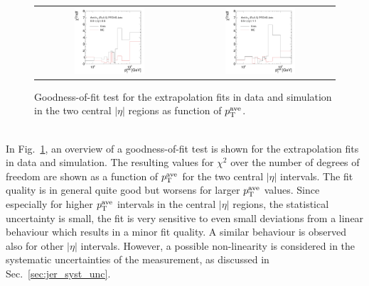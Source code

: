 \begin{figure}[!tp]
  \centering
  \begin{tabular}{cc}
                \includegraphics[width=0.49\textwidth]{figures/GoodnessOfFit_Eta0_final_nominal_v4.pdf} &
                \includegraphics[width=0.49\textwidth]{figures/GoodnessOfFit_Eta1_final_nominal_v4.pdf} \\
  \end{tabular}
  \caption{Goodness-of-fit test for the extrapolation fits in data and simulation in the two central $|\eta|$ regions as function of $p_{\text{T}}^\mathrm{ave}$.}
  \label{fig:goodness-of-fit}
\end{figure}
\\
In Fig.~\ref{fig:goodness-of-fit}, an overview of a goodness-of-fit test is shown for the extrapolation fits in data and simulation. The resulting values for $\chi^2$ over the number of degrees of freedom are shown as a function of $p_{\text{T}}^\mathrm{ave}$ for the two central $|\eta|$ intervals. The fit quality is in general quite good but worsens for larger $p_{\text{T}}^\mathrm{ave}$ values. Since especially for higher $p_{\text{T}}^\mathrm{ave}$ intervals in the central $|\eta|$ regions, the statistical uncertainty is small, the fit is very sensitive to even small deviations from a linear behaviour which results in a minor fit quality. A similar behaviour is observed also for other $|\eta|$ intervals. However, a possible non-linearity is considered in the systematic uncertainties of the measurement, as discussed in Sec.~\ref{sec:jer_syst_unc}.

